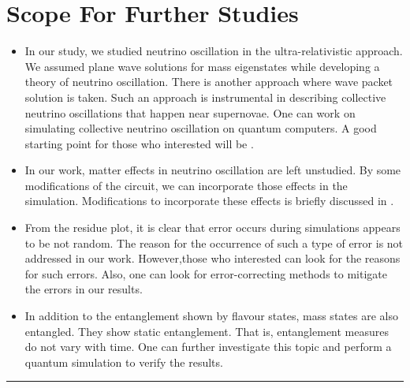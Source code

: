\documentclass[12pt,a4paper]{report}
\begin{document}
\section*{Scope For Further Studies}
\begin{itemize}
	\item In our study, we studied neutrino oscillation in the ultra-relativistic approach. We assumed plane wave solutions for mass eigenstates while developing a theory of neutrino oscillation. There is another approach where wave packet solution is taken. Such an approach is instrumental in describing collective neutrino oscillations that happen near supernovae. One can work on simulating collective neutrino oscillation on quantum computers. A good starting point for those who interested will be \cite{hall}\cite{kubra}.
	\item In our work, matter effects in neutrino oscillation are left unstudied. By some modifications of the circuit, we can incorporate those effects in the simulation. Modifications to incorporate these effects is briefly discussed in \cite{jones}.
	\item From the residue plot, it is clear that error occurs during simulations appears to be not random. The reason for the occurrence of such a type of error is not addressed in our work. However,those who interested can look for the reasons for such errors. Also, one can look for error-correcting methods to mitigate the errors in our results.
	\item In addition to the entanglement shown by flavour states, mass states are also entangled. They show static entanglement. That is, entanglement measures do not vary with time. One can further investigate this topic and perform a quantum simulation to verify the results.

\end{itemize}
\vspace*{3cm}
\begin{center}
\noindent\rule{10cm}{0.4pt}
\end{center}



\printindex
\end{document}
